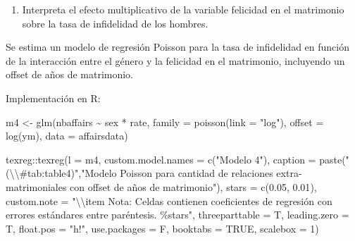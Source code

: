 \documentclass[
  12pt,
  a4paper,
]{article}
\newenvironment{Shaded}{\begin{snugshade}}{\end{snugshade}}
\newcommand{\AttributeTok}[1]{\textcolor[rgb]{0.77,0.63,0.00}{#1}}
\newcommand{\ConstantTok}[1]{\textcolor[rgb]{0.00,0.00,0.00}{#1}}
\newcommand{\DecValTok}[1]{\textcolor[rgb]{0.00,0.00,0.81}{#1}}
\newcommand{\FloatTok}[1]{\textcolor[rgb]{0.00,0.00,0.81}{#1}}
\newcommand{\FunctionTok}[1]{\textcolor[rgb]{0.00,0.00,0.00}{#1}}
\newcommand{\NormalTok}[1]{#1}
\newcommand{\OtherTok}[1]{\textcolor[rgb]{0.56,0.35,0.01}{#1}}
\newcommand{\SpecialCharTok}[1]{\textcolor[rgb]{0.00,0.00,0.00}{#1}}
\newcommand{\StringTok}[1]{\textcolor[rgb]{0.31,0.60,0.02}{#1}}
\providecommand{\tightlist}{%
  \setlength{\itemsep}{0pt}\setlength{\parskip}{0pt}}
\begin{document}
\begin{enumerate}
\def\labelenumi{\alph{enumi})}
\setcounter{enumi}{1}
\tightlist
\item
  Interpreta el efecto multiplicativo de la variable felicidad en el matrimonio sobre la tasa de infidelidad de los hombres.
\end{enumerate}

Se estima un modelo de regresión Poisson para la tasa de infidelidad en función de la interacción entre el género y la felicidad en el matrimonio, incluyendo un offset de años de matrimonio.

Implementación en R:

\begin{Shaded}
\begin{Highlighting}[]
\NormalTok{m4  }\OtherTok{\textless{}{-}} \FunctionTok{glm}\NormalTok{(nbaffairs }\SpecialCharTok{\textasciitilde{}}\NormalTok{ sex }\SpecialCharTok{*}\NormalTok{ rate, }\AttributeTok{family =} \FunctionTok{poisson}\NormalTok{(}\AttributeTok{link =} \StringTok{"log"}\NormalTok{), }
          \AttributeTok{offset =} \FunctionTok{log}\NormalTok{(ym), }\AttributeTok{data =}\NormalTok{ affairsdata)}

\NormalTok{texreg}\SpecialCharTok{::}\FunctionTok{texreg}\NormalTok{(}\AttributeTok{l =}\NormalTok{ m4,}
               \AttributeTok{custom.model.names =} \FunctionTok{c}\NormalTok{(}\StringTok{"Modelo 4"}\NormalTok{),}
               \AttributeTok{caption =} \FunctionTok{paste}\NormalTok{(}\StringTok{"(}\SpecialCharTok{\textbackslash{}\textbackslash{}}\StringTok{\#tab:table4)"}\NormalTok{,}\StringTok{"Modelo Poisson para cantidad de relaciones extra{-}matrimoniales con offset de años de matrimonio"}\NormalTok{),}
               \AttributeTok{stars =} \FunctionTok{c}\NormalTok{(}\FloatTok{0.05}\NormalTok{, }\FloatTok{0.01}\NormalTok{),}
               \AttributeTok{custom.note =} \StringTok{"}\SpecialCharTok{\textbackslash{}\textbackslash{}}\StringTok{item Nota: Celdas contienen coeficientes de regresión con errores estándares entre paréntesis. \%stars"}\NormalTok{,}
               \AttributeTok{threeparttable =}\NormalTok{ T,}
               \AttributeTok{leading.zero =}\NormalTok{ T,}
               \AttributeTok{float.pos =} \StringTok{"h!"}\NormalTok{,}
               \AttributeTok{use.packages =}\NormalTok{ F,}
               \AttributeTok{booktabs =} \ConstantTok{TRUE}\NormalTok{,}
               \AttributeTok{scalebox =} \DecValTok{1}\NormalTok{)}
\end{Highlighting}
\end{Shaded}
\end{document}
